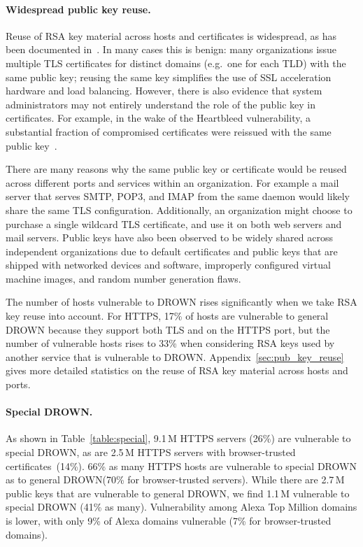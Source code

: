\paragraph{Widespread public key reuse.}
Reuse of RSA key material across hosts and certificates is widespread, as has
been documented
in~\cite{2016holz_analysis_tls-based_protocols_electronic_communication,DBLP:journals/corr/MayerZSH15}. In many
cases this is benign: many organizations issue multiple TLS certificates for
distinct domains (e.g.~one for each TLD) with the same public key; reusing the
same key simplifies the use of SSL acceleration hardware and load balancing.
However, there is also evidence that system administrators may not entirely
understand the role of the public key in certificates. For example, in the wake
of the Heartbleed vulnerability, a substantial fraction of compromised
certificates were reissued with the same public
key~\cite{Durumeric:2014:MH:2663716.2663755}.  

There are many reasons why the same public key or certificate would be reused
across different ports and services within an organization. For example a mail
server that serves SMTP, POP3, and IMAP from the same daemon would likely share
the same TLS configuration.  Additionally, an organization might choose to
purchase a single wildcard TLS certificate, and use it on both web servers and
mail servers. Public keys have also been observed to be widely shared across
independent organizations due to default certificates and public keys that are
shipped with networked devices and software, improperly configured virtual
machine images, and random number generation flaws.

The number of hosts vulnerable to DROWN rises significantly when we take RSA
key reuse into account. For HTTPS, 17\% of hosts are vulnerable to general
DROWN because they support both TLS and \ssltwo on the HTTPS port, but the
number of vulnerable hosts rises to 33\% when considering RSA keys used by
another service that is vulnerable to DROWN\@. Appendix~\ref{sec:pub_key_reuse}
gives more detailed statistics on the reuse of RSA key material across hosts
and ports.

\paragraph{Special DROWN\@.}
As shown in Table~\ref{table:special}, 9.1\,M HTTPS servers (26\%) are
vulnerable to special DROWN, as are 2.5\,M HTTPS servers with browser-trusted
certificates~(14\%). 66\% as many HTTPS hosts are vulnerable to special DROWN
as to general DROWN\@ (70\% for browser-trusted servers). While there are 
2.7\,M public keys that are vulnerable to general DROWN, we find 1.1\,M
vulnerable to special DROWN (41\% as many). Vulnerability among Alexa Top Million
domains is lower, with only 9\% of Alexa domains vulnerable (7\% for
browser-trusted domains).


